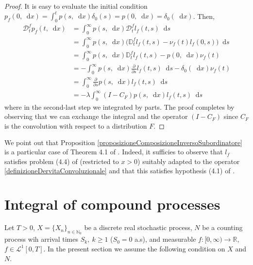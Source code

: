 \documentclass[12pt, twoside, english, headsepline]{article}
\newcommand*\dif{\mathop{}\!\mathrm{d}}  %
\theoremstyle{definition} %
\numberwithin{equation}{section} %
\begin{document}
\begin{proof}
	It is easy to evaluate the initial condition $p_f(0,\dif x) = \int_0^t p(s, \dif x)\delta_0(s) =  p(0,\dif x) = \delta_0(\dif x)$. Then,
	\begin{align*}
		\mathcal{D}_t^f p_f(t, \dif x) &= \int_0^\infty p(s,\dif x) \mathcal{D}_t^f l_f(t,s)\dif s \nonumber\\
		& =  \int_0^\infty p(s,\dif x) \Big( \mathbb{D}_t^f l_f(t,s) -\nu_f(t) l_f(0,s) \Big)\dif s \nonumber\\
		& =  \int_0^\infty p(s,\dif x) \mathbb{D}_t^f l_f(t,s) - p(0,\dif x)\nu_f(t) \nonumber\\
		& =  -\int_0^\infty p(s,\dif x) \frac{\partial}{\partial s}l_f(t,s)\dif s - \delta_0(\dif x) \nu_f(t)\nonumber\\
		& = \int_0^\infty \frac{\partial}{\partial s} p(s,\dif x)  l_f(t,s)\dif s\\
		&= - \lambda \int_0^\infty (I-C_F)p(s,\dif x)  l_f(t,s)\dif s
	\end{align*}
	where in the second-last step we integrated by parts. The proof completes by observing that we can exchange the integral and the operator $(I-C_F)$ since $C_F$ is the convolution with respect to a distribution $F$. 
\end{proof}


We point out that Proposition \ref{proposizioneComposizioneInversoSubordinatore} is a particular case of Theorem 4.1 of \cite{CO2025}. Indeed, it sufficies to observe that $l_f$ satisfies problem (4.4) of \cite{CO2025} (restricted to $x>0$) suitably adapted to the operator \eqref{definizioneDervitaConvoluzionale} and that this satisfies hypothesis (4.1) of \cite{CO2025}.


\section{Integral of compound processes}

Let $T>0$, $X=\{X_n\}_{n\in\mathbb{N}_0}$ be a discrete real stochastic process, $N$ be a counting process wih arrival times $S_k,\ k\ge1$ ($S_0 = 0$ a.s), and measurable $f:[0,\infty)\longrightarrow\mathbb{R}$, $f\in \mathcal{L}^1[0,T]$. In the present section we assume the following condition on $X$ and $N$.
\\
\end{document}
